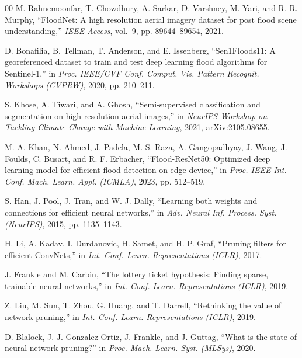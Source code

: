 \documentclass[conference]{IEEEtran}
\begin{document}
\begin{thebibliography}{00}
M. Rahnemoonfar, T. Chowdhury, A. Sarkar, D. Varshney, M. Yari, and
R. R. Murphy, ``FloodNet: A high resolution aerial imagery dataset for
post flood scene understanding,'' \emph{IEEE Access}, vol.~9, pp.
89644--89654, 2021.

D. Bonafilia, B. Tellman, T. Anderson, and E. Issenberg,
``Sen1Floods11: A georeferenced dataset to train and test deep learning
flood algorithms for Sentinel-1,'' in \emph{Proc. IEEE/CVF Conf.
Comput. Vis. Pattern Recognit. Workshops (CVPRW)}, 2020, pp. 210--211.

S. Khose, A. Tiwari, and A. Ghosh, ``Semi-supervised classification and
segmentation on high resolution aerial images,'' in \emph{NeurIPS
Workshop on Tackling Climate Change with Machine Learning}, 2021,
arXiv:2105.08655.

M. A. Khan, N. Ahmed, J. Padela, M. S. Raza, A. Gangopadhyay, J. Wang,
J. Foulds, C. Busart, and R. F. Erbacher, ``Flood-ResNet50: Optimized
deep learning model for efficient flood detection on edge device,'' in
\emph{Proc. IEEE Int. Conf. Mach. Learn. Appl. (ICMLA)}, 2023, pp.
512--519.

S. Han, J. Pool, J. Tran, and W. J. Dally, ``Learning both weights and
connections for efficient neural networks,'' in \emph{Adv. Neural Inf.
Process. Syst. (NeurIPS)}, 2015, pp. 1135--1143.

H. Li, A. Kadav, I. Durdanovic, H. Samet, and H. P. Graf, ``Pruning
filters for efficient ConvNets,'' in \emph{Int. Conf. Learn.
Representations (ICLR)}, 2017.

J. Frankle and M. Carbin, ``The lottery ticket hypothesis: Finding
sparse, trainable neural networks,'' in \emph{Int. Conf. Learn.
Representations (ICLR)}, 2019.

Z. Liu, M. Sun, T. Zhou, G. Huang, and T. Darrell, ``Rethinking the
value of network pruning,'' in \emph{Int. Conf. Learn. Representations
(ICLR)}, 2019.

D. Blalock, J. J. Gonzalez Ortiz, J. Frankle, and J. Guttag, ``What is
the state of neural network pruning?'' in \emph{Proc. Mach. Learn.
Syst. (MLSys)}, 2020.


\end{thebibliography}
\end{document}

